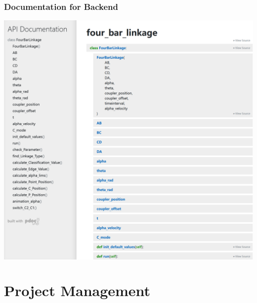 \documentclass[ucs,10pt]{beamer}
\begin{document}
\begin{frame}
\frametitle{Documentation for Backend}
\centering
\includegraphics[height=0.65\textwidth]{./Figures/documentation/doc_four_bar_linkage.png}
\end{frame}

\section{Project Management}
\end{document}
